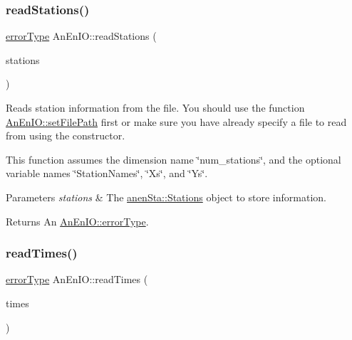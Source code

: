 \subsubsection{\texorpdfstring{read\+Stations()}{readStations()}}
{\footnotesize\ttfamily \mbox{\hyperlink{class_an_en_i_o_aa56bc1ec6610b86db4349bce20f9ead0}{error\+Type}} An\+En\+I\+O\+::read\+Stations (\begin{DoxyParamCaption}\item[{\mbox{\hyperlink{classanen_sta_1_1_stations}{anen\+Sta\+::\+Stations}} \&}]{stations }\end{DoxyParamCaption})}

Reads station information from the file. You should use the function \mbox{\hyperlink{class_an_en_i_o_a98066d375cc78694fda2af1ce37cc8d8}{An\+En\+I\+O\+::set\+File\+Path}} first or make sure you have already specify a file to read from using the constructor.

This function assumes the dimension name \char`\"{}num\+\_\+stations\char`\"{}, and the optional variable names \char`\"{}\+Station\+Names\char`\"{}, \char`\"{}\+Xs\char`\"{}, and \char`\"{}\+Ys\char`\"{}.


\begin{DoxyParams}{Parameters}
{\em stations} & The \mbox{\hyperlink{classanen_sta_1_1_stations}{anen\+Sta\+::\+Stations}} object to store information. \\
\hline
\end{DoxyParams}
\begin{DoxyReturn}{Returns}
An \mbox{\hyperlink{class_an_en_i_o_aa56bc1ec6610b86db4349bce20f9ead0}{An\+En\+I\+O\+::error\+Type}}. 
\end{DoxyReturn}
\mbox{\label{class_an_en_i_o_a19b454b0a9ecb5ecbc2cc2a9c139770b}} 
\subsubsection{\texorpdfstring{read\+Times()}{readTimes()}}
{\footnotesize\ttfamily \mbox{\hyperlink{class_an_en_i_o_aa56bc1ec6610b86db4349bce20f9ead0}{error\+Type}} An\+En\+I\+O\+::read\+Times (\begin{DoxyParamCaption}\item[{\mbox{\hyperlink{classanen_time_1_1_times}{anen\+Time\+::\+Times}} \&}]{times }\end{DoxyParamCaption})}


